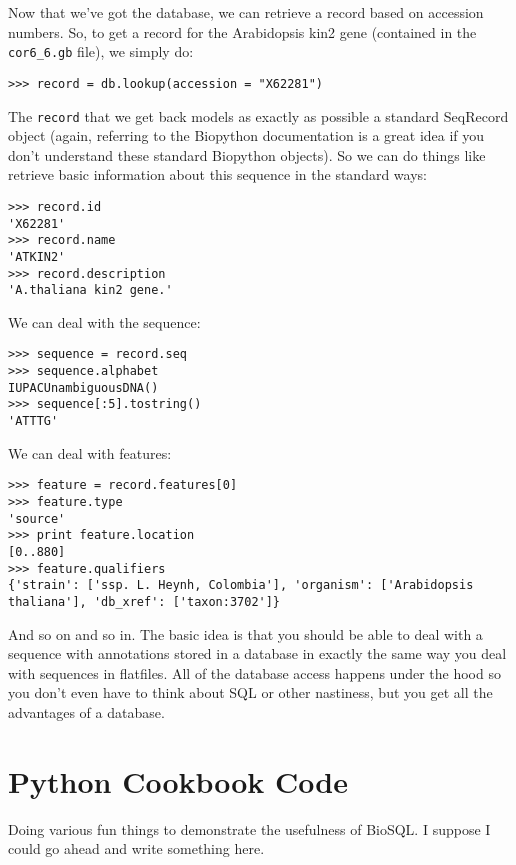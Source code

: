 \documentclass{article}
\begin{document}
Now that we've got the database, we can retrieve a record based on
accession numbers. So, to get a record for the Arabidopsis kin2 gene
(contained in the \verb|cor6_6.gb| file), we simply do:

\begin{verbatim}
>>> record = db.lookup(accession = "X62281")
\end{verbatim}

The \verb|record| that we get back models as exactly as possible a
standard SeqRecord object (again, referring to the Biopython
documentation is a great idea if you don't understand these standard
Biopython objects). So we can do things like retrieve basic information
about this sequence in the standard ways:

\begin{verbatim}
>>> record.id
'X62281'
>>> record.name
'ATKIN2'
>>> record.description
'A.thaliana kin2 gene.'
\end{verbatim}

We can deal with the sequence:

\begin{verbatim}
>>> sequence = record.seq
>>> sequence.alphabet
IUPACUnambiguousDNA()
>>> sequence[:5].tostring()
'ATTTG'
\end{verbatim}

We can deal with features:

\begin{verbatim}
>>> feature = record.features[0]
>>> feature.type
'source'
>>> print feature.location
[0..880]
>>> feature.qualifiers
{'strain': ['ssp. L. Heynh, Colombia'], 'organism': ['Arabidopsis
thaliana'], 'db_xref': ['taxon:3702']}
\end{verbatim}

And so on and so in. The basic idea is that you should be able to deal
with a sequence with annotations stored in a database in exactly the
same way you deal with sequences in flatfiles. All of the database
access happens under the hood so you don't even have to think about SQL
or other nastiness, but you get all the advantages of a database.


\section{Python Cookbook Code}

Doing various fun things to demonstrate the usefulness of BioSQL. I
suppose I could go ahead and write something here.
\end{document}
